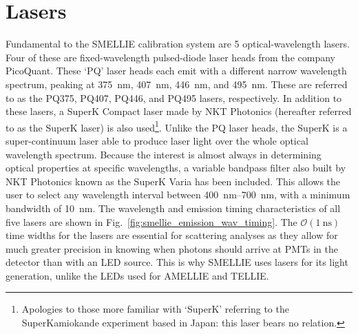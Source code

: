 \section{Lasers}\label{sec:smellie_lasers}
Fundamental to the SMELLIE calibration system are 5 optical-wavelength lasers. Four of these are fixed-wavelength pulsed-diode laser heads from the company PicoQuant. These `PQ' laser heads each emit with a different narrow wavelength spectrum, peaking at \SI{375}{\nm}, \SI{407}{\nm}, \SI{446}{\nm}, and \SI{495}{\nm}. These are referred to as the PQ375, PQ407, PQ446, and PQ495 lasers, respectively. In addition to these lasers, a SuperK Compact laser made by NKT Photonics (hereafter referred to as the SuperK laser) is also used\footnote{
    Apologies to those more familiar with `SuperK' referring to the SuperKamiokande experiment based in Japan: this laser bears no relation.
}. Unlike the PQ laser heads, the SuperK is a super-continuum laser able to produce laser light over the whole optical wavelength spectrum. Because the interest is almost always in determining optical properties at specific wavelengths, a variable bandpass filter also built by NKT Photonics known as the SuperK Varia has been included. This allows the user to select any wavelength interval between \SIrange{400}{700}{\nm}, with a minimum bandwidth of \SI{10}{\nm}. The wavelength and emission timing characteristics of all five lasers are shown in Fig.~\ref{fig:smellie_emission_wav_timing}. The $\mathcal{O}(\SI{1}{\ns})$ time widths for the lasers are essential for scattering analyses as they allow for much greater precision in knowing when photons should arrive at PMTs in the detector than with an LED source. This is why SMELLIE uses lasers for its light generation, unlike the LEDs used for AMELLIE and TELLIE.

